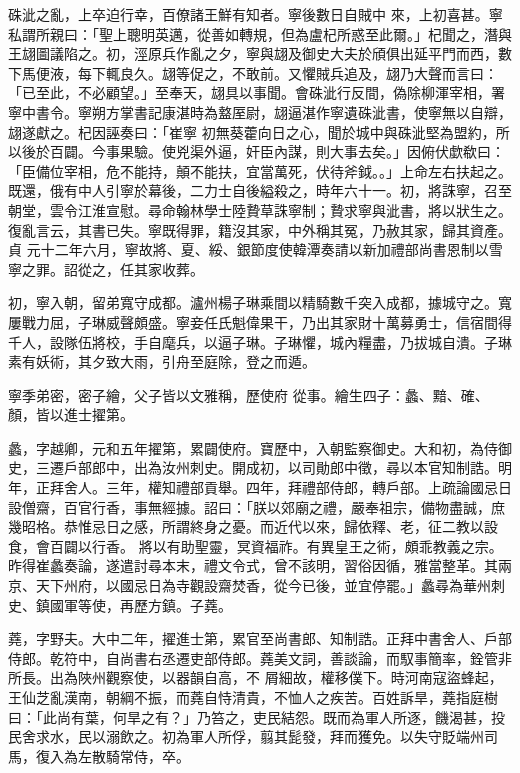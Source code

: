 \begin{pinyinscope}
 硃泚之亂，上卒迫行幸，百僚諸王鮮有知者。寧後數日自賊中
 來，上初喜甚。寧私謂所親曰：「聖上聰明英邁，從善如轉規，但為盧杞所惑至此爾。」杞聞之，潛與王翃圖議陷之。初，涇原兵作亂之夕，寧與翃及御史大夫於頎俱出延平門而西，數下馬便液，每下輒良久。翃等促之，不敢前。又懼賊兵追及，翃乃大聲而言曰：「已至此，不必顧望。」至奉天，翃具以事聞。會硃泚行反間，偽除柳渾宰相，署寧中書令。寧朔方掌書記康湛時為盩厔尉，翃逼湛作寧遺硃泚書，使寧無以自辯，翃遂獻之。杞因誣奏曰：「崔寧
 初無葵藿向日之心，聞於城中與硃泚堅為盟約，所以後於百闢。今事果驗。使兇渠外逼，奸臣內謀，則大事去矣。」因俯伏歔欷曰：「臣備位宰相，危不能持，顛不能扶，宜當萬死，伏待斧鉞。。」上命左右扶起之。既還，俄有中人引寧於幕後，二力士自後縊殺之，時年六十一。初，將誅寧，召至朝堂，雲令江淮宣慰。尋命翰林學士陸贄草誅寧制；贄求寧與泚書，將以狀生之。復亂言云，其書已失。寧既得罪，籍沒其家，中外稱其冤，乃赦其家，歸其資產。貞
 元十二年六月，寧故將、夏、綏、銀節度使韓潭奏請以新加禮部尚書恩制以雪寧之罪。詔從之，任其家收葬。



 初，寧入朝，留弟寬守成都。瀘州楊子琳乘間以精騎數千突入成都，據城守之。寬屢戰力屈，子琳威聲頗盛。寧妾任氏魁偉果干，乃出其家財十萬募勇士，信宿間得千人，設隊伍將校，手自麾兵，以逼子琳。子琳懼，城內糧盡，乃拔城自潰。子琳素有妖術，其夕致大雨，引舟至庭除，登之而遁。



 寧季弟密，密子繪，父子皆以文雅稱，歷使府
 從事。繪生四子：蠡、黯、確、顏，皆以進士擢第。



 蠡，字越卿，元和五年擢第，累闢使府。寶歷中，入朝監察御史。大和初，為侍御史，三遷戶部郎中，出為汝州刺史。開成初，以司勛郎中徵，尋以本官知制誥。明年，正拜舍人。三年，權知禮部貢舉。四年，拜禮部侍郎，轉戶部。上疏論國忌日設僧齋，百官行香，事無經據。詔曰：「朕以郊廟之禮，嚴奉祖宗，備物盡誠，庶幾昭格。恭惟忌日之感，所謂終身之憂。而近代以來，歸依釋、老，征二教以設食，會百闢以行香。
 將以有助聖靈，冥資福祚。有異皇王之術，頗乖教義之宗。昨得崔蠡奏論，遂遣討尋本末，禮文令式，曾不該明，習俗因循，雅當整革。其兩京、天下州府，以國忌日為寺觀設齋焚香，從今已後，並宜停罷。」蠡尋為華州刺史、鎮國軍等使，再歷方鎮。子蕘。



 蕘，字野夫。大中二年，擢進士第，累官至尚書郎、知制誥。正拜中書舍人、戶部侍郎。乾符中，自尚書右丞遷吏部侍郎。蕘美文詞，善談論，而馭事簡率，銓管非所長。出為陜州觀察使，以器韻自高，不
 屑細故，權移僕下。時河南寇盜蜂起，王仙芝亂漢南，朝綱不振，而蕘自恃清貴，不恤人之疾苦。百姓訴旱，蕘指庭樹曰：「此尚有葉，何旱之有？」乃笞之，吏民結怨。既而為軍人所逐，饑渴甚，投民舍求水，民以溺飲之。初為軍人所俘，翦其髭發，拜而獲免。以失守貶端州司馬，復入為左散騎常侍，卒。




\end{pinyinscope}
